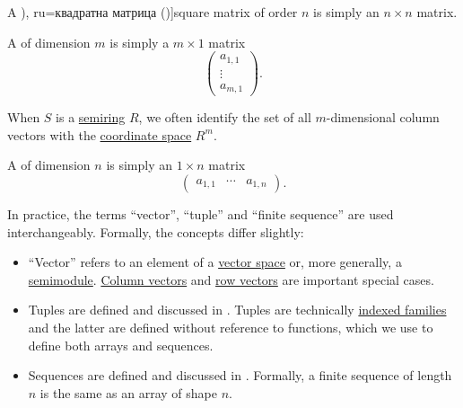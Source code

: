\begin{definition}
\begin{thmenum}
     A \term[bg=квадратна матрица (\cite[18]{Обрешков1962ВисшаАлгебра}), ru=квадратна матрица (\cite[\S 1.1]{Тыртышников2007ЛинейнаяАлгебра})]{square matrix} of order \( n \) is simply an \( n \times n \) matrix.

     A  of dimension \( m \) is simply a \( m \times 1 \) matrix
    \begin{equation*}
      \begin{pmatrix}
        a_{1,1} \\
        \vdots  \\
        a_{m,1}
      \end{pmatrix}.
    \end{equation*}

    When \( S \) is a \hyperref[def:semiring]{semiring} \( R \), we often identify the set of all \( m \)-dimensional column vectors with the \hyperref[def:sequence_space]{coordinate space} \( R^m \).

     A  of dimension \( n \) is simply an \( 1 \times n \) matrix
    \begin{equation*}
      \begin{pmatrix}
        a_{1,1} & \cdots & a_{1,n}
      \end{pmatrix}.
    \end{equation*}
  \end{thmenum}
\end{definition}

\begin{remark}\label{rem:vector_etymology}
  In practice, the terms \enquote{vector}, \enquote{tuple} and \enquote{finite sequence} are used interchangeably. Formally, the concepts differ slightly:

  \begin{itemize}
    \item \enquote{Vector} refers to an element of a \hyperref[def:vector_space]{vector space} or, more generally, a \hyperref[def:semimodule]{semimodule}. \hyperref[def:array/column_vector]{Column vectors} and \hyperref[def:array/row_vector]{row vectors} are important special cases.

    \item Tuples are defined and discussed in . Tuples are technically \hyperref[def:cartesian_product/indexed_family]{indexed families} and the latter are defined without reference to functions, which we use to define both arrays and sequences.

    \item Sequences are defined and discussed in . Formally, a finite sequence of length \( n \) is the same as an array of shape \( n \).
  \end{itemize}
\end{remark}

